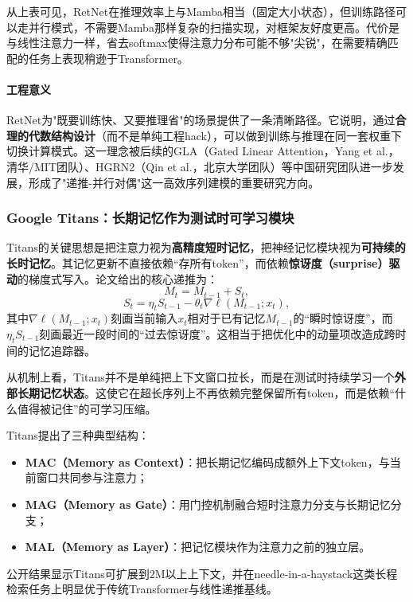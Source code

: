 \documentclass[12pt,a4paper]{article}
\begin{document}
从上表可见，RetNet在推理效率上与Mamba相当（固定大小状态），但训练路径可以走并行模式，不需要Mamba那样复杂的扫描实现，对框架友好度更高。代价是与线性注意力一样，省去softmax使得注意力分布可能不够"尖锐"，在需要精确匹配的任务上表现稍逊于Transformer。

\paragraph{工程意义}

RetNet为"既要训练快、又要推理省"的场景提供了一条清晰路径。它说明，通过\textbf{合理的代数结构设计}（而不是单纯工程hack），可以做到训练与推理在同一套权重下切换计算模式。这一理念被后续的GLA（Gated Linear Attention，Yang et al.，清华/MIT团队）、HGRN2（Qin et al.，北京大学团队）等中国研究团队进一步发展，形成了"递推-并行对偶"这一高效序列建模的重要研究方向。

\subsubsection{Google Titans：长期记忆作为测试时可学习模块}

Titans的关键思想是把注意力视为\textbf{高精度短时记忆}，把神经记忆模块视为\textbf{可持续的长时记忆}。其记忆更新不直接依赖“存所有token”，而依赖\textbf{惊讶度（surprise）驱动}的梯度式写入。论文给出的核心递推为：
\begin{equation}
M_t = M_{t-1} + S_t,
\end{equation}
\begin{equation}
S_t = \eta_t S_{t-1} - \theta_t \nabla \ell(M_{t-1}; x_t),
\end{equation}
其中$\nabla \ell(M_{t-1}; x_t)$刻画当前输入$x_t$相对于已有记忆$M_{t-1}$的“瞬时惊讶度”，而$\eta_t S_{t-1}$刻画最近一段时间的“过去惊讶度”。这相当于把优化中的动量项改造成跨时间的记忆追踪器。

从机制上看，Titans并不是单纯把上下文窗口拉长，而是在测试时持续学习一个\textbf{外部长期记忆状态}。这使它在超长序列上不再依赖完整保留所有token，而是依赖“什么值得被记住”的可学习压缩。

Titans提出了三种典型结构：
\begin{itemize}
    \item \textbf{MAC（Memory as Context）}：把长期记忆编码成额外上下文token，与当前窗口共同参与注意力；
    \item \textbf{MAG（Memory as Gate）}：用门控机制融合短时注意力分支与长期记忆分支；
    \item \textbf{MAL（Memory as Layer）}：把记忆模块作为注意力之前的独立层。
\end{itemize}
公开结果显示Titans可扩展到$2$M以上上下文，并在needle-in-a-haystack这类长程检索任务上明显优于传统Transformer与线性递推基线。
\end{document}
